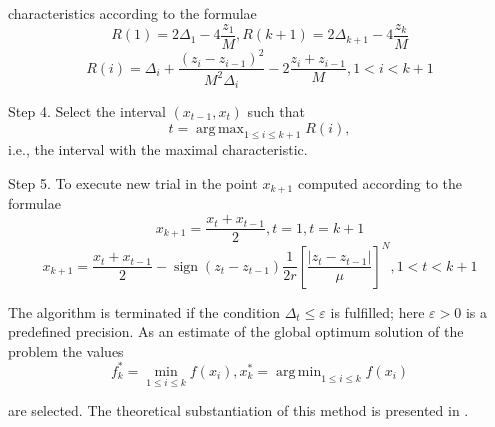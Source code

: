 \documentclass[procedia]{easychair}
\DeclareMathOperator*{\argmax}{arg\,max}
\DeclareMathOperator*{\argmin}{arg\,min}
\DeclareMathOperator{\sign}{sign}
\begin{document}
characteristics according to the formulae
\begin{equation}
\label{step3_1}
R(1)=2\Delta_1-4\dfrac{z_1}{M},R(k+1)=2\Delta_{k+1}-4\dfrac{z_k}{M}
\end{equation}
\begin{equation}
\label{step3_2}
R(i)=\Delta_i+\dfrac{(z_i-z_{i-1})^2}{M^2\Delta_i}-2\dfrac{z_i+z_{i-1}}{M},1<i<k+1
\end{equation}
\par
Step 4. Select the interval \((x_{t-1}, x_t)\) such that
\begin{equation}
\label{step4}
t=\argmax_{1\leqslant i \leqslant k+1}R(i),
\end{equation}
i.e., the interval with the maximal characteristic.
\par
Step 5. To execute new trial in the point \(x_{k+1}\) computed according to the formulae
\begin{displaymath}
x_{k+1}=\dfrac{x_{t}+x_{t-1}}{2},t=1,t=k+1
\end{displaymath}
\begin{equation}
\label{step5}
x_{k+1}=\dfrac{x_{t}+x_{t-1}}{2}-\sign(z_{t}-z_{t-1})\dfrac{1}{2r}\left[\dfrac{|z_{t}-z_{t-1}|}{\mu}\right]^N,1<t<k+1
\end{equation}
\par
The algorithm is terminated if the condition \(\Delta_{t}\leqslant \varepsilon\) is fulfilled;
here \(\varepsilon>0\) is a predefined precision. As an estimate of the global optimum solution of the problem the values
\begin{equation}
f_k^*=\min_{1\leqslant i \leqslant k}f(x_i), x_k^*=\argmin_{1\leqslant i \leqslant k}f(x_i)
\end{equation}
\par
are selected. The theoretical substantiation of this method is presented in \cite{strOptBook}.

\end{document}
